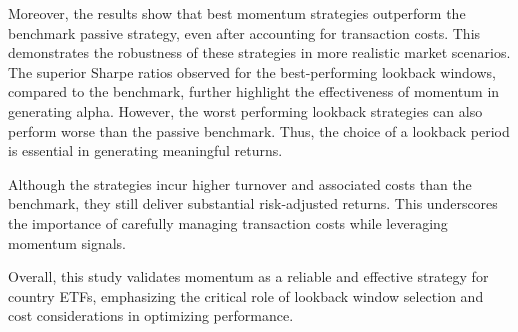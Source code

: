 \documentclass[a4paper,12pt,twoside]{article}
\begin{document}
Moreover, the results show that best momentum strategies outperform the benchmark passive strategy, even after accounting for transaction costs. This demonstrates the robustness of these strategies in more realistic market scenarios. The superior Sharpe ratios observed for the best-performing lookback windows, compared to the benchmark, further highlight the effectiveness of momentum in generating alpha. However, the worst performing lookback strategies can also perform worse than the passive benchmark. Thus, the choice of a lookback period is essential in generating meaningful returns. 

Although the strategies incur higher turnover and associated costs than the benchmark, they still deliver substantial risk-adjusted returns. This underscores the importance of carefully managing transaction costs while leveraging momentum signals. 

Overall, this study validates momentum as a reliable and effective strategy for country ETFs, emphasizing the critical role of lookback window selection and cost considerations in optimizing performance.

\clearpage


	
	
\end{document}
